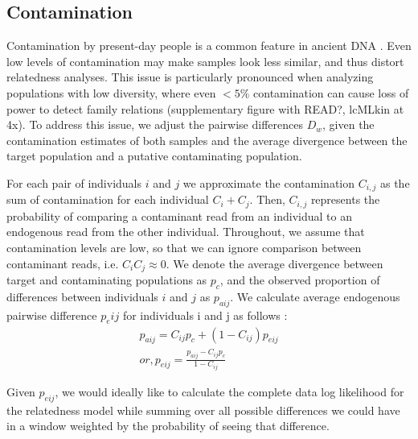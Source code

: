 \documentclass[12pt, letterpaper]{article}
\begin{document}
\subsection{Contamination}

Contamination by present-day people is a common feature in ancient DNA \cite{peyregne_present-day_2020} . Even low levels of contamination may make samples look less similar, and thus distort relatedness analyses. This issue is particularly pronounced  when analyzing populations with  low diversity, where even $<5\%$ contamination can cause loss of power to detect family relations (supplementary figure with READ?, lcMLkin at 4x). To address this issue, we  adjust the  pairwise differences $D_w$, given the contamination estimates of both samples and the average divergence between the target population and a putative contaminating population.

For each pair of individuals $i$ and $j$ we approximate the contamination $C_{i,j}$ as the sum of contamination for each individual $C_i + C_j$. Then, $C_{i,j}$ represents the probability of comparing a contaminant read from an individual to an endogenous read from the other individual. Throughout, we assume that contamination levels are low, so that we can ignore comparison between contaminant reads, i.e. $C_iC_j \approx 0$.  We denote the average divergence between target and contaminating populations as $p_c$, and the observed proportion of differences between individuals $i$ and $j$ as $p_{aij}$. We calculate average endogenous pairwise difference $p_eij$ for individuals i and j as follows \cite{noauthor_ancient_nodate}:
\begin{align}
    p_{aij} = C_{ij}  p_c + (1-C_{ij})  p_{eij}\\
    or, p_{eij} = \frac{p_{aij} - C_{ij}  p_c}{1-C_{ij}} 
\end{align}

Given $p_{eij}$, we would ideally like to calculate the complete data log likelihood for the relatedness model while summing over all possible differences we could have in a window weighted by the probability of seeing that difference. 
\end{document}
